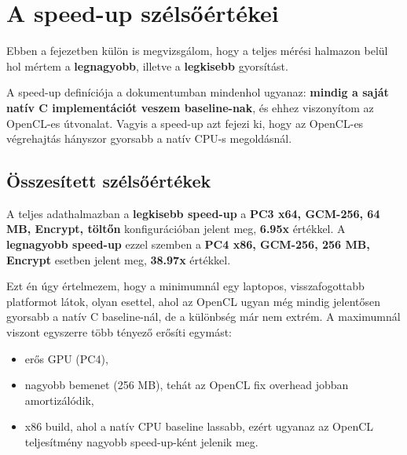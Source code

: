 \chapter{A speed-up szélsőértékei}

Ebben a fejezetben külön is megvizsgálom, hogy a teljes mérési halmazon belül
hol mértem a \textbf{legnagyobb}, illetve a \textbf{legkisebb} gyorsítást.

A speed-up definíciója a dokumentumban mindenhol ugyanaz:
\textbf{mindig a saját natív C implementációt veszem baseline-nak}, és ehhez
viszonyítom az OpenCL-es útvonalat. Vagyis a speed-up azt fejezi ki,
hogy az OpenCL-es végrehajtás hányszor gyorsabb a natív CPU-s megoldásnál.

\section{Összesített szélsőértékek}

\begin{table}[h!]
  \centering
  \caption{A teljes mérési halmaz legkisebb és legnagyobb OpenCL speed-up értéke.}
\end{table}

A teljes adathalmazban a \textbf{legkisebb speed-up} a \textbf{PC3 x64, GCM-256, 64 MB, Encrypt, töltőn}
konfigurációban jelent meg, \textbf{6.95x} értékkel. A \textbf{legnagyobb speed-up} ezzel szemben a
\textbf{PC4 x86, GCM-256, 256 MB, Encrypt} esetben jelent meg, \textbf{38.97x} értékkel.

Ezt én úgy értelmezem, hogy a minimumnál egy laptopos, visszafogottabb platformot látok,
olyan esettel, ahol az OpenCL ugyan még mindig jelentősen gyorsabb a natív C baseline-nál,
de a különbség már nem extrém. A maximumnál viszont egyszerre több tényező erősíti egymást:
\begin{itemize}
  \item erős GPU (PC4),
  \item nagyobb bemenet (256 MB), tehát az OpenCL fix overhead jobban amortizálódik,
  \item x86 build, ahol a natív CPU baseline lassabb, ezért ugyanaz az OpenCL teljesítmény nagyobb speed-up-ként jelenik meg.
\end{itemize}

